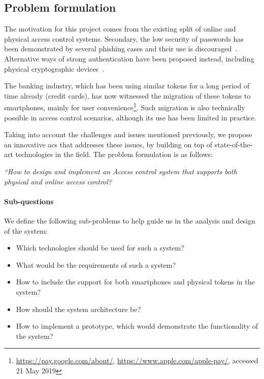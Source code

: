 \subsection{Problem formulation} \label{problemFormulation}
The motivation for this project comes from the existing split of online and physical access control systems. Secondary, the low security of passwords has been demonstrated by several phishing cases and their use is discouraged~\cite{Huang2011UsingAttacks, Paul2010OAuthAnti-pattern}. Alternative ways of strong authentication have been proposed instead, including physical cryptographic devices~\cite{FIDOFIDO2Project}.

The banking industry, which has been using similar tokens for a long period of time already (credit cards), has now witnessed the migration of these tokens to smartphones, mainly for user convenience\footnote{\url{https://pay.google.com/about/}, \url{https://www.apple.com/apple-pay/}, accessed 21 May 2019}. Such migration is also technically possible in access control scenarios, although its use has been limited in practice.

Taking into account the challenges and issues mentioned previously, we propose an innovative \acrshort{acs} that addresses these issues, by building on top of state-of-the-art technologies in the field. The problem formulation is as follows:

\begin{center}
    \textit{“How to design and implement an Access control system that supports both physical and online access control?}
\end{center}

\paragraph{Sub-questions}
We define the following sub-problems to help guide us in the analysis and design of the system:

\begin{itemize}[noitemsep]
    \item Which technologies should be used for such a system?
    \item What would be the requirements of such a system?
    \item How to include the support for both smartphones and physical tokens in the system?
    \item How should the system architecture be?
    \item How to implement a prototype, which would demonstrate the functionality of the system?
\end{itemize}